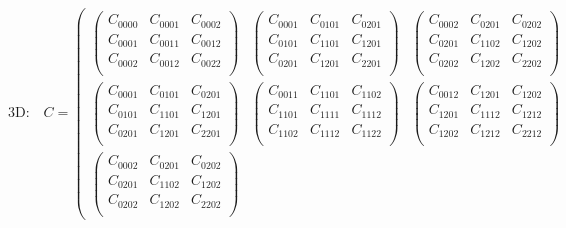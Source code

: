 \documentclass[10pt]{article}
\begin{document}
$$
\text{3D:}\quad
C =
\left(\begin{array}{ccc}
 \left(\begin{array}{ccc}
 C_{0000} & C_{0001} & C_{0002} \\
 C_{0001} & C_{0011} & C_{0012} \\
 C_{0002} & C_{0012} & C_{0022} \\ \end{array} \right) &
 \left( \begin{array}{ccc}
 C_{0001} & C_{0101} & C_{0201} \\
 C_{0101} & C_{1101} & C_{1201} \\
 C_{0201} & C_{1201} & C_{2201} \\ \end{array} \right) &
 \left( \begin{array}{ccc}
 C_{0002} & C_{0201} & C_{0202} \\
 C_{0201} & C_{1102} & C_{1202} \\
 C_{0202} & C_{1202} & C_{2202} \\ \end{array} \right) \\
 \left( \begin{array}{ccc}
 C_{0001} & C_{0101} & C_{0201} \\
 C_{0101} & C_{1101} & C_{1201} \\
 C_{0201} & C_{1201} & C_{2201} \\ \end{array} \right) &
 \left( \begin{array}{ccc}
 C_{0011} & C_{1101} & C_{1102} \\
 C_{1101} & C_{1111} & C_{1112} \\
 C_{1102} & C_{1112} & C_{1122} \\ \end{array} \right) &
 \left( \begin{array}{ccc}
 C_{0012} & C_{1201} & C_{1202} \\
 C_{1201} & C_{1112} & C_{1212} \\
 C_{1202} & C_{1212} & C_{2212} \\ \end{array} \right) \\
 \left( \begin{array}{ccc}
 C_{0002} & C_{0201} & C_{0202} \\
 C_{0201} & C_{1102} & C_{1202} \\
 C_{0202} & C_{1202} & C_{2202} \\ \end{array} \right) &

\end{array}$$
\end{document}
